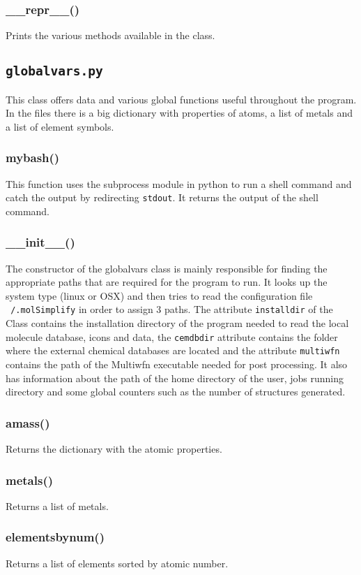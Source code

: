 \documentclass[a4paper,12pt]{assignment}
\begin{document}
\subsubsection{\_\_repr\_\_()}
Prints the various methods available in the class.

\subsection{\texttt{globalvars.py}}
This class offers data and various global functions useful throughout the program. In the files there is a big dictionary with properties of atoms, a list of metals and a list of element symbols. 
\subsubsection{mybash()}
This function uses the subprocess module in python to run a shell command and catch the output by redirecting \texttt{stdout}. It returns the output of the shell command.
\subsubsection{\_\_init\_\_()}
The constructor of the globalvars class is mainly responsible for finding the appropriate paths that are required for the program to run. It looks up the system type (linux or OSX) and then tries to read the configuration file \texttt{~/.molSimplify} in order to assign 3 paths. The attribute \texttt{installdir} of the Class contains the installation directory of the program needed to read the local molecule database, icons and data, the \texttt{cemdbdir} attribute contains the folder where the external chemical databases are located and the attribute \texttt{multiwfn} contains the path of the Multiwfn executable needed for post processing. It also has information about the path of the home directory of the user, jobs running directory and some global counters such as the number of structures generated.
\subsubsection{amass()}
Returns the dictionary with the atomic properties. 
\subsubsection{metals()}
Returns a list of metals.
\subsubsection{elementsbynum()}
Returns a list of elements sorted by atomic number.
\end{document}
